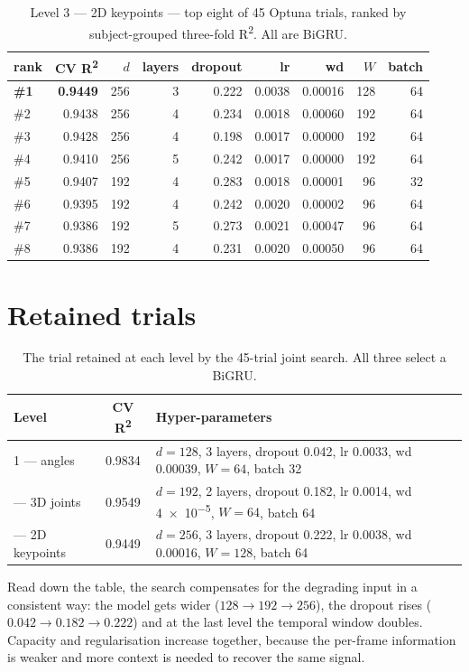 \begin{table}[H]
\centering
\caption{Level 3 --- 2D keypoints --- top eight of 45 Optuna trials, ranked by subject-grouped three-fold R\textsuperscript{2}. All are BiGRU.}
\label{tab:app:sctrialsL3}
\scriptsize
\begin{tabular}{@{}lrrrrrrrr@{}}
\toprule
\textbf{rank} & \textbf{CV R\textsuperscript{2}} & \textbf{$d$} & \textbf{layers} & \textbf{dropout} & \textbf{lr} & \textbf{wd} & \textbf{$W$} & \textbf{batch} \\
\midrule
\textbf{\#1} & \textbf{0.9449} & 256 & 3 & 0.222 & 0.0038 & 0.00016 & 128 & 64 \\
\#2 & 0.9438 & 256 & 4 & 0.234 & 0.0018 & 0.00060 & 192 & 64 \\
\#3 & 0.9428 & 256 & 4 & 0.198 & 0.0017 & 0.00000 & 192 & 64 \\
\#4 & 0.9410 & 256 & 5 & 0.242 & 0.0017 & 0.00000 & 192 & 64 \\
\#5 & 0.9407 & 192 & 4 & 0.283 & 0.0018 & 0.00001 & 96 & 32 \\
\#6 & 0.9395 & 192 & 4 & 0.242 & 0.0020 & 0.00002 & 96 & 64 \\
\#7 & 0.9386 & 192 & 5 & 0.273 & 0.0021 & 0.00047 & 96 & 64 \\
\#8 & 0.9386 & 192 & 4 & 0.231 & 0.0020 & 0.00050 & 96 & 64 \\
\bottomrule
\end{tabular}
\end{table}
\section{Retained trials}

\begin{table}[H]
\centering
\caption{The trial retained at each level by the 45-trial joint search. All three
select a BiGRU.}
\label{tab:app:sctrials}
\small
\begin{tabularx}{\textwidth}{@{}l c X@{}}
\toprule
\textbf{Level} & \textbf{CV R\textsuperscript{2}} & \textbf{Hyper-parameters} \\
\midrule
1 --- angles    & 0.9834 & $d=128$, 3 layers, dropout \num{0.042}, lr
\num{0.0033}, wd \num{0.00039}, $W=64$, batch 32 \\
\addlinespace
2 --- 3D joints & 0.9549 & $d=192$, 2 layers, dropout \num{0.182}, lr
\num{0.0014}, wd \num{4e-5}, $W=64$, batch 64 \\
\addlinespace
3 --- 2D keypoints & 0.9449 & $d=256$, 3 layers, dropout \num{0.222}, lr
\num{0.0038}, wd \num{0.00016}, $W=128$, batch 64 \\
\bottomrule
\end{tabularx}
\end{table}

Read down the table, the search compensates for the degrading input in a
consistent way: the model gets wider ($128\to192\to256$), the dropout rises
($\num{0.042}\to\num{0.182}\to\num{0.222}$) and at the last level the temporal
window doubles. Capacity and regularisation increase together, because the
per-frame information is weaker and more context is needed to recover the same
signal.

